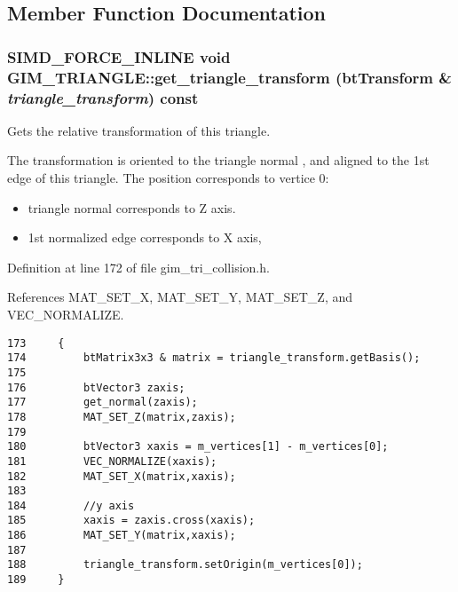\subsection{Member Function Documentation}
\hypertarget{class_g_i_m___t_r_i_a_n_g_l_e_500db747a4c740b3de1756336263a53d}{
\subsubsection[get\_\-triangle\_\-transform]{\setlength{\rightskip}{0pt plus 5cm}SIMD\_\-FORCE\_\-INLINE void GIM\_\-TRIANGLE::get\_\-triangle\_\-transform (btTransform \& {\em triangle\_\-transform}) const}}
\label{class_g_i_m___t_r_i_a_n_g_l_e_500db747a4c740b3de1756336263a53d}


Gets the relative transformation of this triangle. 

The transformation is oriented to the triangle normal , and aligned to the 1st edge of this triangle. The position corresponds to vertice 0:\begin{itemize}
\item triangle normal corresponds to Z axis.\item 1st normalized edge corresponds to X axis, \end{itemize}


Definition at line 172 of file gim\_\-tri\_\-collision.h.

References MAT\_\-SET\_\-X, MAT\_\-SET\_\-Y, MAT\_\-SET\_\-Z, and VEC\_\-NORMALIZE.

\begin{Code}\begin{verbatim}173     {
174         btMatrix3x3 & matrix = triangle_transform.getBasis();
175 
176         btVector3 zaxis;
177         get_normal(zaxis);
178         MAT_SET_Z(matrix,zaxis);
179 
180         btVector3 xaxis = m_vertices[1] - m_vertices[0];
181         VEC_NORMALIZE(xaxis);
182         MAT_SET_X(matrix,xaxis);
183 
184         //y axis
185         xaxis = zaxis.cross(xaxis);
186         MAT_SET_Y(matrix,xaxis);
187 
188         triangle_transform.setOrigin(m_vertices[0]);
189     }
\end{verbatim}
\end{Code}


